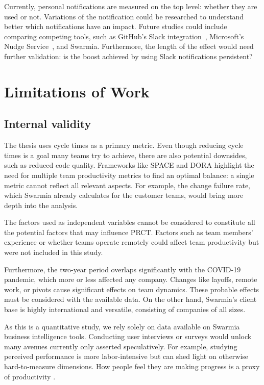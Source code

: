 Currently, personal notifications are measured on the top level: whether they are used or not. Variations of the notification could be researched to understand better which notifications have an impact. Future studies could include comparing competing tools, such as GitHub's Slack integration~\cite{noauthor_integrationsslack_nodate}, Microsoft's Nudge Service~\cite{maddila_nudge_2022}, and Swarmia. Furthermore, the length of the effect would need further validation: is the boost achieved by using Slack notifications persistent?


\section{Limitations of Work}



\subsection{Internal validity}

The thesis uses cycle times as a primary metric. Even though reducing cycle times is a goal many teams try to achieve, there are also potential downsides, such as reduced code quality. Frameworks like SPACE and DORA highlight the need for multiple team productivity metrics to find an optimal balance: a single metric cannot reflect all relevant aspects. For example, the change failure rate, which Swarmia already calculates for the customer teams, would bring more depth into the analysis. 

The factors used as independent variables cannot be considered to constitute all the potential factors that may influence PRCT. Factors such as team members' experience or whether teams operate remotely could affect team productivity but were not included in this study. 

Furthermore, the two-year period overlaps significantly with the COVID-19 pandemic, which more or less affected any company. Changes like layoffs, remote work, or pivots cause significant effects on team dynamics. These probable effects must be considered with the available data. On the other hand, Swarmia's client base is highly international and versatile, consisting of companies of all sizes. 

As this is a quantitative study, we rely solely on data available on Swarmia business intelligence tools. Conducting user interviews or surveys would unlock many avenues currently only asserted speculatively. For example, studying perceived performance is more labor-intensive but can shed light on otherwise hard-to-measure dimensions. How people feel they are making progress is a proxy of productivity \cite{forsgren_space_2021}.

